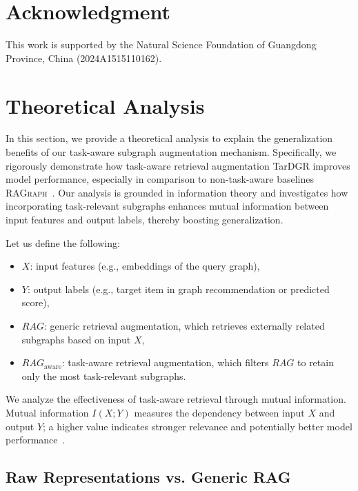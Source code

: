 \documentclass[letterpaper]{article} %
\begin{document}
\section*{Acknowledgment}
This work is supported by the Natural Science Foundation of Guangdong Province, China (2024A1515110162).

% 
% 
\appendix
\clearpage

\section{Theoretical Analysis}
\label{appendix:theory_analysis}
In this section, we provide a theoretical analysis to explain the generalization benefits of our task-aware subgraph augmentation mechanism. Specifically, we rigorously demonstrate how task-aware retrieval augmentation TarDGR improves model performance, especially in comparison to non-task-aware baselines \textsc{RAGraph~\cite{jiang2024ragraph}}. Our analysis is grounded in information theory and investigates how incorporating task-relevant subgraphs enhances mutual information between input features and output labels, thereby boosting generalization.

Let us define the following:

\begin{itemize}
    \item $X$: input features (e.g., embeddings of the query graph),
    \item $Y$: output labels (e.g., target item in graph recommendation or predicted score),
    \item $RAG$: generic retrieval augmentation, which retrieves externally related subgraphs based on input $X$,
    \item $RAG_{\text{aware}}$: task-aware retrieval augmentation, which filters $RAG$ to retain only the most task-relevant subgraphs.
\end{itemize}

We analyze the effectiveness of task-aware retrieval through mutual information. Mutual information $I(X; Y)$ measures the dependency between input $X$ and output $Y$; a higher value indicates stronger relevance and potentially better model performance~\cite{mao2021neuron}.

\subsection{Raw Representations vs. Generic RAG}
\end{document}
